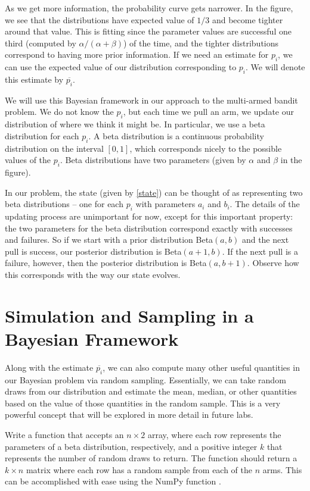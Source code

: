 As we get more information, the probability curve gets narrower.
In the figure, we see that the distributions have expected
value of $1/3$ and become tighter around that value.
This is fitting since the parameter values are successful one third (computed by $\alpha/(\alpha+\beta)$)
of the time, and the tighter distributions correspond to having
more prior information.  If we need an estimate for $p_i$, we can use
the expected value of our distribution corresponding to $p_i$.
We will denote this estimate by $\overline{p_i}$.

We will use this Bayesian framework in our approach to the multi-armed bandit problem.
We do not know the $p_i$, but each time we pull an arm, we update our distribution of
where we think it might be.
In particular, we use a beta distribution for each $p_i$.
A beta distribution is a continuous probability distribution on the interval $[0,1]$,
which corresponds nicely to the possible values of the $p_i$.  Beta distributions have
two parameters (given by $\alpha$ and $\beta$ in the figure).

In our problem, the state (given by \eqref{state}) can be thought of as representing two
beta distributions -- one for each $p_i$ with parameters $a_i$ and $b_i$.
The details of the updating process are unimportant for now, except
for this important property: the two parameters for the beta distribution
correspond exactly with successes and failures.
So if we start with a prior distribution Beta$(a,b)$ and the next pull is success,
our posterior distribution is Beta$(a+1,b)$. If the next pull is a failure, however, then
the posterior distribution is Beta$(a,b+1)$.
Observe how this corresponds with the way our state evolves.

\section*{Simulation and Sampling in a Bayesian Framework}
Along with the estimate $\overline{p_i}$, we can also compute many other useful
quantities in our Bayesian problem via random sampling.  Essentially, we can take
random draws from our distribution and estimate the mean, median, or other
quantities based on the value of those quantities in the random sample.
This is a very powerful concept that will be explored in more detail in future labs.

\begin{problem}
Write a function  that accepts an $n\times 2$ array, where each
row represents the parameters of a beta distribution, respectively, and a positive integer $k$
that represents the number of random draws to return.
The function should return a $k\times n$ matrix where each row has a random sample
from each of the $n$ arms.  This can be accomplished with ease using the NumPy function
.
\label{prob:simdata}
\end{problem}

